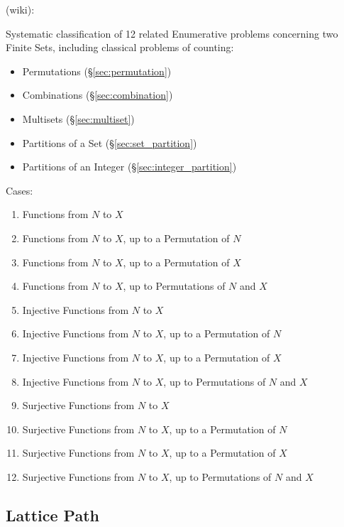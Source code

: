 (wiki):

Systematic classification of 12 related Enumerative problems concerning two
Finite Sets, including classical problems of counting:
\begin{itemize}
  \item Permutations (\S\ref{sec:permutation})
  \item Combinations (\S\ref{sec:combination})
  \item Multisets (\S\ref{sec:multiset})
  \item Partitions of a Set (\S\ref{sec:set_partition})
  \item Partitions of an Integer (\S\ref{sec:integer_partition})
\end{itemize}

Cases:
\begin{enumerate}
  \item Functions from $N$ to $X$
  \item Functions from $N$ to $X$, up to a Permutation of $N$
  \item Functions from $N$ to $X$, up to a Permutation of $X$
  \item Functions from $N$ to $X$, up to Permutations of $N$ and $X$
  \item Injective Functions from $N$ to $X$
  \item Injective Functions from $N$ to $X$, up to a Permutation of $N$
  \item Injective Functions from $N$ to $X$, up to a Permutation of $X$
  \item Injective Functions from $N$ to $X$, up to Permutations of $N$ and $X$
  \item Surjective Functions from $N$ to $X$
  \item Surjective Functions from $N$ to $X$, up to a Permutation of $N$
  \item Surjective Functions from $N$ to $X$, up to a Permutation of $X$
  \item Surjective Functions from $N$ to $X$, up to Permutations of $N$ and $X$
\end{enumerate}



\subsection{Lattice Path}\label{sec:lattice_path}

